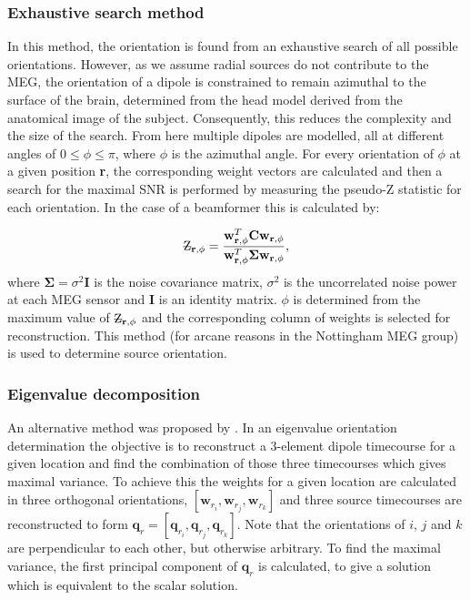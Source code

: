 \subsubsection{Exhaustive search method} In this method, the orientation is found from an exhaustive search of all possible orientations. However, as we assume radial sources do not contribute to the MEG, the orientation of a dipole is constrained to remain azimuthal to the surface of the brain, determined from the head model derived from the anatomical image of the subject. Consequently, this reduces the complexity and the size of the search. From here multiple dipoles are modelled, all at different angles of $0 \leq \phi \leq \pi$, where $\phi$ is the azimuthal angle. For every orientation of $\phi$ at a given position \textbf{r}, the corresponding weight vectors are calculated and then a search for the maximal SNR is performed  by measuring the pseudo-Z statistic for each orientation. In the case of a beamformer this is calculated by:

\begin{equation}
\text{\sout{Z}}_{\mathbf{r},\phi} = \frac{\mathbf{w}_{\mathbf{r},\phi}^T\mathbf{C}\mathbf{w}_{\mathbf{r},\phi}}{\mathbf{w}_{\mathbf{r},\phi}^T\mathbf{\Sigma}\mathbf{w}_{\mathbf{r},\phi}},
\end{equation} where $\mathbf{\Sigma} = \sigma^2\mathbf{I}$ is the noise covariance matrix, $\sigma^2$ is the uncorrelated noise power at each MEG sensor and $\mathbf{I}$ is an identity matrix. $\phi$ is determined from the maximum value of $\text{\sout{Z}}_{\mathbf{r},\phi}$ and the corresponding column of weights is selected for reconstruction. This method (for arcane reasons in the Nottingham MEG group) is used to determine source orientation. 

\subsubsection{Eigenvalue decomposition}

An alternative method was proposed by \cite{Sekihara2004}. In an eigenvalue orientation determination the objective is to reconstruct a 3-element dipole timecourse for a given location and find the combination of those three timecourses which gives maximal variance. To achieve this the weights for a given location are calculated in three orthogonal orientations, $[\mathbf{w}_{r_i}, \mathbf{w}_{r_j}, \mathbf{w}_{r_k}]$ and three source timecourses are reconstructed to form  $\mathbf{q}_r = [\mathbf{q}_{r_i}, \mathbf{q}_{r_j}, \mathbf{q}_{r_k}]$. Note that the orientations of $i$, $j$ and $k$ are perpendicular to each other, but otherwise arbitrary. To find the maximal variance, the first principal component of $\mathbf{q}_r$ is calculated, to give a solution which is equivalent to the scalar solution.  

